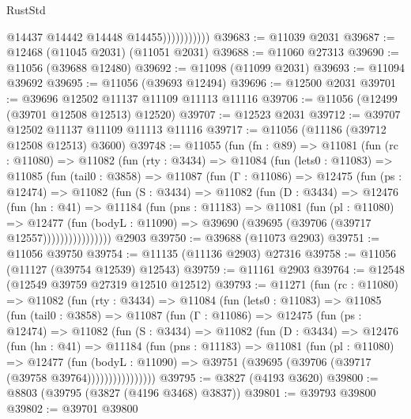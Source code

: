 \begin{lexlean}{RustStd}
\begin{coremodule}
                          @14437
                          @14442
                          @14448
                          @14455)))))))))))
@39683 := @11039 @2031
@39687 := @12468 (@11045 @2031) (@11051 @2031)
@39688 := @11060 @27313
@39690 := @11056 (@39688 @12480)
@39692 := @11098 (@11099 @2031)
@39693 := @11094 @39692
@39695 := @11056 (@39693 @12494)
@39696 := @12500 @2031
@39701 := @39696 @12502 @11137 @11109 @11113 @11116
@39706 := @11056 (@12499 (@39701 @12508 @12513) @12520)
@39707 := @12523 @2031
@39712 := @39707 @12502 @11137 @11109 @11113 @11116
@39717 := @11056 (@11186 (@39712 @12508 @12513) @3600)
@39748 := @11055
    (fun (fn : @89) =>
    @11081
      (fun (rc : @11080) =>
      @11082
        (fun (rty : @3434) =>
        @11084
          (fun (lets0 : @11083) =>
          @11085
            (fun (tail0 : @3858) =>
            @11087
              (fun (Γ : @11086) =>
              @12475
                (fun (ps : @12474) =>
                @11082
                  (fun (S : @3434) =>
                  @11082
                    (fun (D : @3434) =>
                    @12476
                      (fun (hn : @41) =>
                      @11184
                        (fun (pns : @11183) =>
                        @11081
                          (fun (pl : @11080) =>
                          @12477
                            (fun (bodyL : @11090) =>
                            @39690 (@39695 (@39706 (@39717 @12557))))))))))))))))
    @2903
@39750 := @39688 (@11073 @2903)
@39751 := @11056 @39750
@39754 := @11135 (@11136 @2903) @27316
@39758 := @11056 (@11127 (@39754 @12539) @12543)
@39759 := @11161 @2903
@39764 := @12548 (@12549 @39759 @27319 @12510 @12512)
@39793 := @11271
    (fun (rc : @11080) =>
    @11082
      (fun (rty : @3434) =>
      @11084
        (fun (lets0 : @11083) =>
        @11085
          (fun (tail0 : @3858) =>
          @11087
            (fun (Γ : @11086) =>
            @12475
              (fun (ps : @12474) =>
              @11082
                (fun (S : @3434) =>
                @11082
                  (fun (D : @3434) =>
                  @12476
                    (fun (hn : @41) =>
                    @11184
                      (fun (pns : @11183) =>
                      @11081
                        (fun (pl : @11080) =>
                        @12477
                          (fun (bodyL : @11090) =>
                          @39751 (@39695 (@39706 (@39717 (@39758 @39764))))))))))))))))
@39795 := @3827 (@4193 @3620)
@39800 := @8803 (@39795 (@3827 (@4196 @3468) @3837))
@39801 := @39793 @39800
@39802 := @39701 @39800

\end{coremodule}
\end{lexlean}
